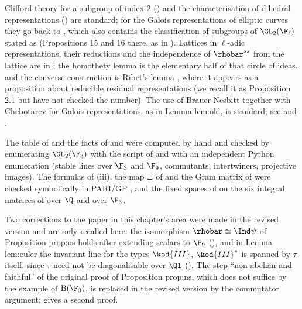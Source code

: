 Clifford theory for a subgroup of index $2$ () and the characterisation of dihedral representations
() are standard; for the Galois representations of elliptic curves they go back to \cite[Section 2]{Serre72}, which
also contains the classification of subgroups of $\GL_2(\F_\ell)$ stated as  (Propositions 15 and 16 there, as in
). Lattices in $\ell$-adic representations, their reductions and the independence of $\rhobar^{ss}$ from the lattice are in
\cite[Chapter I]{SerreAbelian}; the homothety lemma  is the elementary half of that circle of ideas, and the converse
construction is Ribet's lemma \cite[Section 2]{Ribet76}, where it appears as a proposition about reducible residual representations (we recall
it as Proposition 2.1 but have not checked the number). The use of Brauer-Nesbitt together with Chebotarev for Galois representations,
as in Lemma lem:old, is standard; see \cite{DDT} and .

The table of  and the facts of  and  were computed by hand and checked by
enumerating $\GL_2(\F_3)$ with the script of  and with an independent Python enumeration (stable lines over $\F_3$ and $\F_9$,
commutants, intertwiners, projective images). The formulas of (iii), the map $\Xi$ of  and the Gram
matrix of  were checked symbolically in PARI/GP \cite{PARI}, and the fixed spaces of  on the six
integral matrices of  over $\Q$ and over $\F_3$.

Two corrections to the paper in this chapter's area were made in the revised version and are only recalled here: the isomorphism
$\rhobar\simeq\Ind\psi$ of Proposition prop:ns holds after extending scalars to $\F_9$ (), and in Lemma lem:euler the invariant
line for the types $\kod{III}$, $\kod{III}^*$ is spanned by $\tau$ itself, since $\tau$ need not be diagonalisable over $\Ql$ (). The step
``non-abelian and faithful'' of the original proof of Proposition prop:ns, which does not suffice by the example of $\mathrm B(\F_3)$, is replaced in
the revised version by the commutator argument;  gives a second proof.
